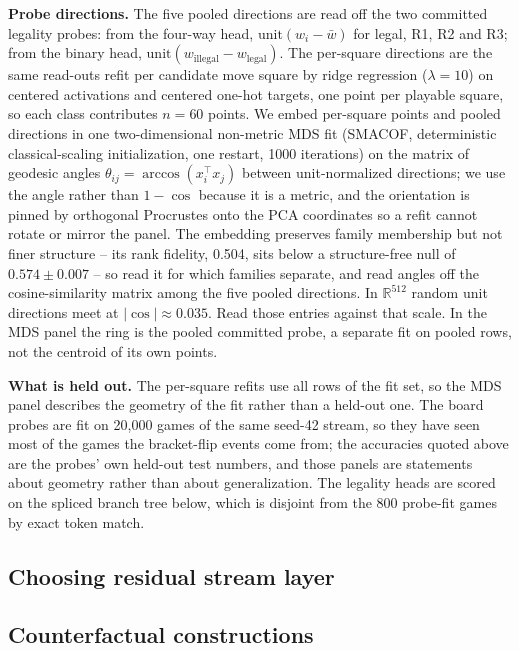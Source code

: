 \documentclass{article}
\begin{document}
\textbf{Probe directions.} The five pooled directions are read off the two committed legality
probes: from the four-way head, $\mathrm{unit}(w_i - \bar{w})$ for legal, R1, R2 and R3; from the
binary head, $\mathrm{unit}(w_{\mathrm{illegal}} - w_{\mathrm{legal}})$. The per-square directions are the
same read-outs refit per candidate move square by ridge regression ($\lambda = 10$) on centered
activations and centered one-hot targets, one point per playable square, so each class
contributes $n = 60$ points. We embed per-square points and pooled directions in one
two-dimensional non-metric MDS fit (SMACOF, deterministic classical-scaling initialization, one
restart, 1000 iterations) on the matrix of geodesic angles $\theta_{ij} = \arccos(x_i^\top x_j)$
between unit-normalized directions; we use the angle rather than $1 - \cos$ because it is a
metric, and the orientation is pinned by orthogonal Procrustes onto the PCA coordinates so a
refit cannot rotate or mirror the panel. The embedding preserves family membership but not finer
structure -- its rank fidelity, 0.504, sits below a structure-free null of $0.574 \pm 0.007$ --
so read it for which families separate, and read angles off the cosine-similarity matrix among
the five pooled directions. In $\mathbb{R}^{512}$ random unit directions meet at $|\cos| \approx
0.035$. Read those entries against that scale. In the MDS panel
the ring is the pooled committed probe, a separate fit on pooled rows, not the centroid of its
own points.

\textbf{What is held out.} The per-square refits use all rows of the fit set, so the MDS panel
describes the geometry of the fit rather than a held-out one. The board probes are fit on 20,000
games of the same seed-42 stream, so they have seen most of the games the bracket-flip events
come from; the accuracies quoted above are the probes' own held-out test numbers, and those
panels are statements about geometry rather than about generalization. The legality heads are
scored on the spliced branch tree below, which is disjoint from the 800 probe-fit games by exact
token match.

\subsection{Choosing residual stream layer}

\subsection{Counterfactual constructions}
\end{document}
